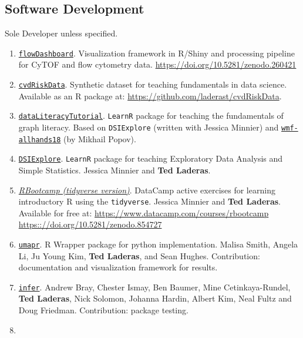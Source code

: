 \documentclass[11pt,]{article}
\begin{document}
\subsection{Software Development}\label{software-development}

Sole Developer unless specified.

\begin{enumerate}
\def\labelenumi{\arabic{enumi}.}
\item
  \href{https://laderast.github.io/flowDashboard/}{\texttt{flowDashboard}}.
  Visualization framework in R/Shiny and processing pipeline for CyTOF
  and flow cytometry data. \url{https://doi.org/10.5281/zenodo.260421}
\item
  \href{https://laderast.github.io/cvdRiskData/}{\texttt{cvdRiskData}}.
  Synthetic dataset for teaching fundamentals in data science. Available
  as an R package at: \url{https://github.com/laderast/cvdRiskData}.
\item
  \href{https://github.com/laderast/dataLiteracyTutorial}{\texttt{dataLiteracyTutorial}}.
  \texttt{LearnR} package for teaching the fundamentals of graph
  literacy. Based on \texttt{DSIExplore} (written with Jessica Minnier)
  and
  \href{https://github.com/laderast/wmf-allhands18}{\texttt{wmf-allhands18}}
  (by Mikhail Popov).
\item
  \href{https://github.com/laderast/DSIExplore}{\texttt{DSIExplore}}.
  \texttt{LearnR} package for teaching Exploratory Data Analysis and
  Simple Statistics. Jessica Minnier and \textbf{Ted Laderas}.
\item
  \href{https://www.datacamp.com/courses/rbootcamp}{\emph{RBootcamp
  (tidyverse version)}}. DataCamp active exercises for learning
  introductory R using the \texttt{tidyverse}. Jessica Minnier and
  \textbf{Ted Laderas}. Available for free at:
  \url{https://www.datacamp.com/courses/rbootcamp}
  \url{https:://doi.org/10.5281/zenodo.854727}
\item
  \href{https://github.com/ropenscilabs/umapr}{\texttt{umapr}}. R
  Wrapper package for python implementation. Malisa Smith, Angela Li, Ju
  Young Kim, \textbf{Ted Laderas}, and Sean Hughes. Contribution:
  documentation and visualization framework for results.
\item
  \href{http://infer.netlify.com}{\texttt{infer}}. Andrew Bray, Chester
  Ismay, Ben Baumer, Mine Cetinkaya-Rundel, \textbf{Ted Laderas}, Nick
  Solomon, Johanna Hardin, Albert Kim, Neal Fultz and Doug Friedman.
  Contribution: package testing.
\item

\end{enumerate}
\end{document}
